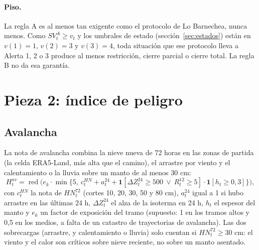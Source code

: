 \paragraph{Piso.} La regla A es al menos tan exigente como el protocolo de Lo Barnechea, nunca menos. Como $SV^A_t \ge v_t$ y los umbrales de estado (sección~\ref{sec:estados}) están en $v(1)=1$, $v(2)=3$ y $v(3)=4$, toda situación que ese protocolo lleva a Alerta 1, 2 o 3 produce al menos restricción, cierre parcial o cierre total. La regla B no da esa garantía.

\section{Pieza 2: índice de peligro}\label{sec:peligro}


\subsection{Avalancha}
La nota de avalancha combina la nieve nueva de 72 horas en las zonas de partida (la celda ERA5-Land, más alta que el camino), el arrastre por viento y el calentamiento o la lluvia sobre un manto de al menos 30 cm:
\begin{equation}
H^{av}_t = \operatorname{red}\!\Big( e_k \cdot \min\big\{5,\ c^{HN}_t + a^{24}_t + \mathbf{1}[\Delta Z^{24}_t \ge 500 \ \lor\ R^{12}_t \ge 5]\cdot\mathbf{1}[h_t \ge 0{,}3]\big\}\Big),
\end{equation}
con $c^{HN}_t$ la nota de $HN^{72}_t$ (cortes 10, 20, 30, 50 y 80 cm), $a^{24}_t$ igual a 1 si hubo arrastre en las últimas 24 h, $\Delta Z^{24}_t$ el alza de la isoterma en 24 h, $h_t$ el espesor del manto y $e_k$ un factor de exposición del tramo (supuesto: 1 en los tramos altos y 0,5 en los medios, a falta de un catastro de trayectorias de avalancha). Las dos sobrecargas (arrastre, y calentamiento o lluvia) solo cuentan si $HN^{72}_t \ge 30$ cm: el viento y el calor son críticos sobre nieve reciente, no sobre un manto asentado.

